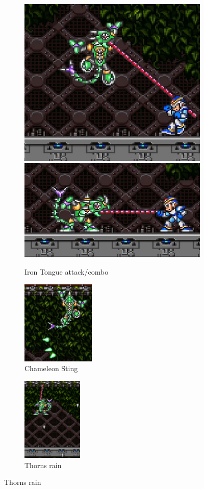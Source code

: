 \begin{figure}[htp]
	\centering
	\begin{subfigure}{\linewidth}
		\centering
		\includegraphics[width=0.4\linewidth]{figures/X1/Sting_chameleon/Chameleon_tongue_1.jpg}
		\includegraphics[width=0.5\linewidth]{figures/X1/Sting_chameleon/Chameleon_tongue_2.jpg}
		\caption{Iron Tongue attack/combo}
	\end{subfigure}
	\begin{subfigure}[t]{0.3\linewidth}
		\centering
		\includegraphics[height=4cm]{figures/X1/Sting_chameleon/Chameleon_sting.jpg}
		\caption{Chameleon Sting}
	\end{subfigure}
	\begin{subfigure}[t]{0.3\linewidth}
		\centering
		\includegraphics[height=4cm]{figures/X1/Sting_chameleon/Chameleon_spike_fall.jpg}
		\caption{Thorns rain}
	\end{subfigure}

\end{figure}
